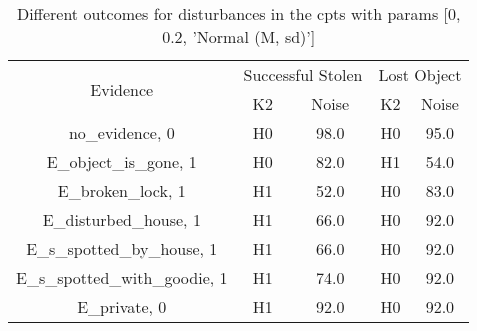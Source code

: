 \begin{table}\begin{tabular}{c|cc|cc}\toprule\multirow{2}{*}{Evidence} & \multicolumn{2}{c}{Successful Stolen} & \multicolumn{2}{c}{Lost Object} \\& {K2} & {Noise} & {K2} & {Noise} \\\midrule
no\_evidence, 0 & H0&98.0&H0&95.0\\E\_object\_is\_gone, 1 & \cellcolor{Bittersweet}H0&\cellcolor{Bittersweet}82.0&\cellcolor{Bittersweet}H1&\cellcolor{Bittersweet}54.0\\E\_broken\_lock, 1 & \cellcolor{Bittersweet}H1&\cellcolor{Bittersweet}52.0&\cellcolor{Bittersweet}H0&\cellcolor{Bittersweet}83.0\\E\_disturbed\_house, 1 & \cellcolor{Bittersweet}H1&\cellcolor{Bittersweet}66.0&\cellcolor{Bittersweet}H0&\cellcolor{Bittersweet}92.0\\E\_s\_spotted\_by\_house, 1 & \cellcolor{Bittersweet}H1&\cellcolor{Bittersweet}66.0&\cellcolor{Bittersweet}H0&\cellcolor{Bittersweet}92.0\\E\_s\_spotted\_with\_goodie, 1 & \cellcolor{Bittersweet}H1&\cellcolor{Bittersweet}74.0&\cellcolor{Bittersweet}H0&\cellcolor{Bittersweet}92.0\\E\_private, 0 & \cellcolor{Bittersweet}H1&\cellcolor{Bittersweet}92.0&\cellcolor{Bittersweet}H0&\cellcolor{Bittersweet}92.0\\\bottomrule\end{tabular}\caption{Different outcomes for disturbances in the cpts with params [0, 0.2, 'Normal (M, sd)']}\end{table}